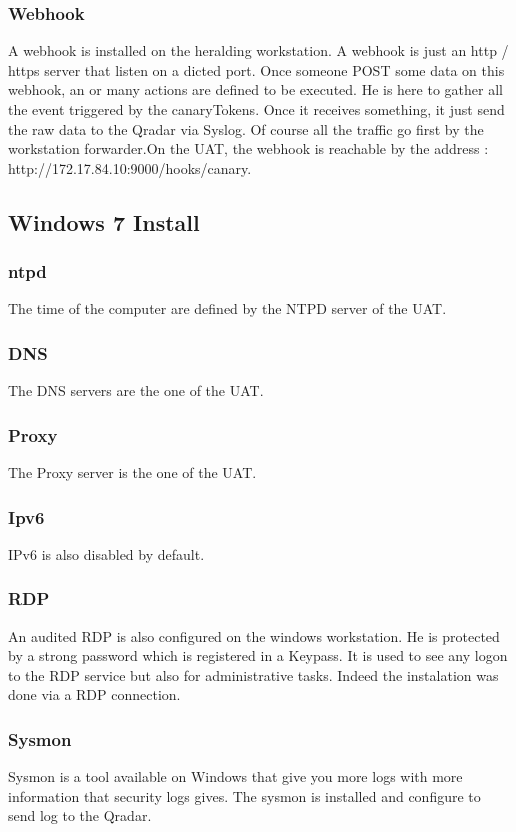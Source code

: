 \documentclass{tnreport}
\begin{document}
\subsubsection{Webhook}
A webhook is installed on the heralding workstation. A webhook is just an http / https server that listen on a dicted port. Once someone POST some data on this webhook, an or many actions are defined to be executed. He is here to gather all the event triggered by the canaryTokens. Once it receives something, it just send the raw data to the Qradar via Syslog. Of course all the traffic go first by the workstation forwarder.\eol On the \gls{UAT}, the webhook is reachable by the address : http://172.17.84.10:9000/hooks/canary.


\subsection{Windows 7 Install}
\subsubsection{ntpd}
The time of the computer are defined by the NTPD server of the \gls{UAT}. 
\subsubsection{DNS}
The DNS servers are the one of the \gls{UAT}.
\subsubsection{Proxy}
The Proxy server is the one of the \gls{UAT}.
\subsubsection{Ipv6}
IPv6 is also disabled by default.
\subsubsection{RDP}
An audited RDP is also configured on the windows workstation. He is protected by a strong password which is registered in a Keypass. It is used to see any logon to the RDP service but also for administrative tasks. Indeed the instalation was done via a RDP connection.
\subsubsection{Sysmon}
Sysmon is a tool available on Windows that give you more logs with more information that security logs gives. The sysmon is installed and configure to send log to the Qradar.
\end{document}
